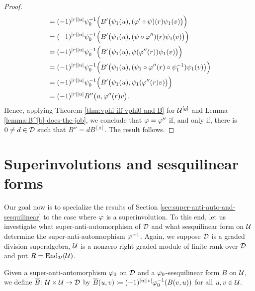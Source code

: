 \begin{proof}
\begin{align*}
        &= (-1)^{|r||u|} \psi_0 ^{-1} \Big( B' \big( \psi_1(u), (\varphi'\circ \psi)(r)\psi_1(v) \big) \Big)\\
        &= (-1)^{|r||u|} \psi_0^{-1} \Big( B' \big( \psi_1(u), (\psi\circ \varphi'')(r) \psi_1(v) \big) \Big)\\
        &= (-1)^{|r||u|} \psi_0^{-1} \Big( B' \big( \psi_1(u), \psi (\varphi''(r)) \psi_1(v) \big) \Big)\\
        &= (-1)^{|r||u|} \psi_0^{-1} \Big( B' \big( \psi_1(u), (\psi_1 \circ \varphi''(r) \circ \psi_1^{-1}) \psi_1(v) \big) \Big)\\
        &= (-1)^{|r||u|} \psi_0^{-1} \Big( B' \big( \psi_1(u), \psi_1 (\varphi''(r) v) \big) \Big)\\
        &= (-1)^{|r||u|} B'' \big( u, \varphi''(r) v\big).
    \end{align*}
    Hence, applying Theorem \ref{thm:vphi-iff-vphi0-and-B} for $\mathcal U^{[g]}$ and Lemma \ref{lemma:B^[b]-does-the-job}, we conclude that $\varphi = \varphi''$ if, and only if, there is $0 \neq d \in \mathcal{D}$ such that $B'' = dB^{[g]}$. 
    The result follows. 
\end{proof}


\section{Superinvolutions and sesquilinear forms}

Our goal now is to specialize the results of Section \ref{sec:super-anti-auto-and-sesquilinear} to the case where $\varphi$ is a superinvolution. 
To this end, let us investigate what super-anti-automorphism of $\mathcal{D}$ and what sesquilinear form on $\mathcal U$ determine the super-anti-automorphism $\varphi^{-1}$. 
Again, we suppose $\mathcal{D}$ is a graded division superalgebra, $\mathcal U$ is a nonzero right graded module of finite rank over $\mathcal{D}$ and put $R = \operatorname{End}_{\mathcal{D}} (\mathcal U)$.

\begin{defi}\label{def:barB}
    Given a super-anti-automorphism $\varphi_0$ on $\mathcal{D}$ and a $\varphi_0$-sesqui\-li\-near form $B$ on $\mathcal U$,  we define $\overline {B}\colon \mathcal U\times \mathcal U \to \mathcal{D}$ by $\overline {B} (u,v) \coloneqq (-1)^{|u||v|} \varphi_0^{-1} (B(v, u))$ for all $u, v \in \mathcal U$.
\end{defi}


